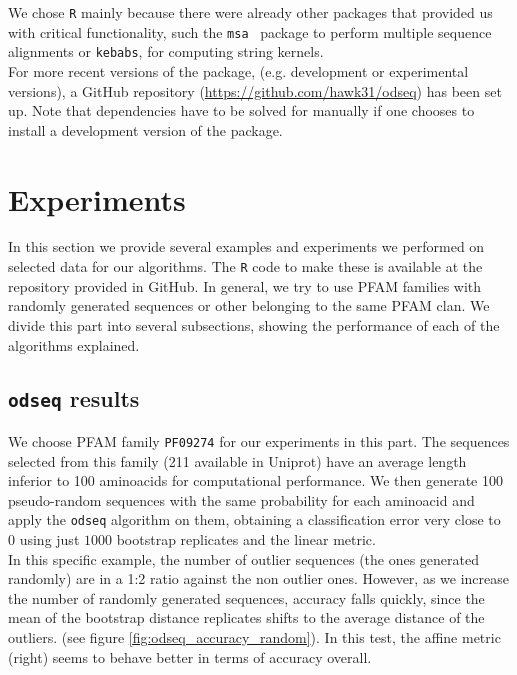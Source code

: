 \documentclass[a4paper]{llncs}
\begin{document}
We chose \texttt{R} mainly because there were already other packages that provided us with critical functionality, such the \texttt{msa}~\cite{EnricoBonatesta2015} package to perform multiple sequence alignments or \texttt{kebabs}, for computing string kernels.\\

For more recent versions of the package, (e.g. development or experimental versions), a GitHub repository (\url{https://github.com/hawk31/odseq}) has been set up. Note that dependencies have to be solved for manually if one chooses to install a development version of the package.

\section{Experiments}
In this section we provide several examples and experiments we performed on selected data for our algorithms. The \texttt{R} code to make these is available at the repository provided in GitHub. In general, we try to use PFAM families with randomly generated sequences or other belonging to the same PFAM clan. We divide this part into several subsections, showing the performance of each of the algorithms explained.

\subsection{\texttt{odseq} results}

We choose PFAM family \texttt{PF09274} for our experiments in this part. The sequences selected from this family (211 available in Uniprot) have an average length inferior to 100 aminoacids for computational performance. We then generate 100 pseudo-random sequences with the same probability for each aminoacid and apply the \texttt{odseq} algorithm on them, obtaining a classification error very close to 0 using just $1000$ bootstrap replicates and the linear metric.\\

In this specific example, the number of outlier sequences (the ones generated randomly) are in a 1:2 ratio against the non outlier ones. However, as we increase the number of randomly generated sequences, accuracy falls quickly, since the mean of the bootstrap distance replicates shifts to the average distance of the outliers. (see figure \ref{fig:odseq_accuracy_random}). In this test, the affine metric (right) seems to behave better in terms of accuracy overall.  \\
\end{document}
